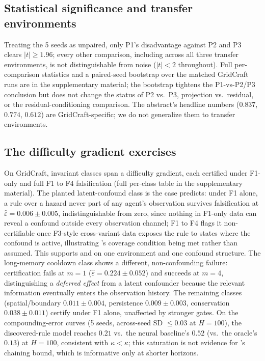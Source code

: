 \documentclass[letterpaper]{article} %
\let\autoref\Cref
\theoremstyle{plain}
\theoremstyle{definition}
\theoremstyle{remark}
\begin{document}
\subsection{Statistical significance and transfer environments}
\label{sec:exp-significance}

Treating the 5 seeds as unpaired, only P1's disadvantage against P2 and P3 clears $|t|\ge1.96$; every other comparison, including across all three transfer environments, is not distinguishable from noise ($|t|<2$ throughout). Full per-comparison statistics and a paired-seed bootstrap over the matched GridCraft runs are in the supplementary material; the bootstrap tightens the P1-vs-P2/P3 conclusion but does not change the status of P2 vs.\ P3, projection vs.\ residual, or the residual-conditioning comparison. The abstract's headline numbers ($0.837$, $0.774$, $0.612$) are GridCraft-specific; we do not generalize them to transfer environments.

\subsection{The difficulty gradient exercises \autoref{thm:t5}}
\label{sec:exp-gradient}

On GridCraft, invariant classes span a difficulty gradient, each certified under F1-only and full F1 to F4 falsification (full per-class table in the supplementary material). The planted latent-confound class is the case \autoref{thm:t5} predicts: under F1 alone, a rule over a hazard never part of any agent's observation survives falsification at $\hat\varepsilon=0.006\pm0.005$, indistinguishable from zero, since nothing in F1-only data can reveal a confound outside every observation channel; F1 to F4 flags it non-certifiable once F3-style cross-variant data exposes the rule to states where the confound is active, illustrating \autoref{thm:t7}'s coverage condition being met rather than assumed. This supports \autoref{thm:t5} and \autoref{thm:t7} on one environment and one confound structure. The long-memory cooldown class shows a different, non-confounding failure: certification fails at $m=1$ ($\hat\varepsilon=0.224\pm0.052$) and succeeds at $m=4$, distinguishing a \emph{deferred effect} from a latent confounder because the relevant information eventually enters the observation history. The remaining classes (spatial/boundary $0.011\pm0.004$, persistence $0.009\pm0.003$, conservation $0.038\pm0.011$) certify under F1 alone, unaffected by stronger gates. On the compounding-error curves (5 seeds, across-seed SD $\le0.03$ at $H=100$), the discovered-rule model reaches $0.21$ vs.\ the neural baseline's $0.52$ (vs.\ the oracle's $0.13$) at $H=100$, consistent with $\hat\kappa<\kappa$; this saturation is not evidence for \autoref{thm:t3}'s chaining bound, which is informative only at shorter horizons.
\end{document}

